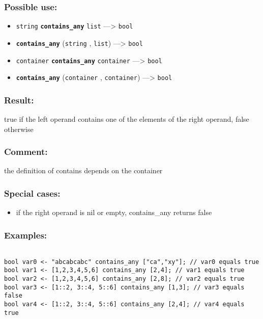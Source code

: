 \documentclass[]{book}
\providecommand{\tightlist}{%
  \setlength{\itemsep}{0pt}\setlength{\parskip}{0pt}}
\theoremstyle{definition}
\theoremstyle{definition}
\theoremstyle{definition}
\theoremstyle{remark}
\begin{document}
\subsubsection{Possible use:}\label{possible-use-101}

\begin{itemize}
\tightlist
\item
  \texttt{string} \textbf{\texttt{contains\_any}} \texttt{list}
  ---\textgreater{} \texttt{bool}
\item
  \textbf{\texttt{contains\_any}} (\texttt{string} , \texttt{list})
  ---\textgreater{} \texttt{bool}
\item
  \texttt{container} \textbf{\texttt{contains\_any}} \texttt{container}
  ---\textgreater{} \texttt{bool}
\item
  \textbf{\texttt{contains\_any}} (\texttt{container} ,
  \texttt{container}) ---\textgreater{} \texttt{bool}
\end{itemize}

\subsubsection{Result:}\label{result-99}

true if the left operand contains one of the elements of the right
operand, false otherwise

\subsubsection{Comment:}\label{comment-26}

the definition of contains depends on the container

\subsubsection{Special cases:}\label{special-cases-34}

\begin{itemize}
\tightlist
\item
  if the right operand is nil or empty, contains\_any returns false
\end{itemize}

\subsubsection{Examples:}\label{examples-78}

\begin{verbatim}
 
bool var0 <- "abcabcabc" contains_any ["ca","xy"]; // var0 equals true 
bool var1 <- [1,2,3,4,5,6] contains_any [2,4]; // var1 equals true  
bool var2 <- [1,2,3,4,5,6] contains_any [2,8]; // var2 equals true 
bool var3 <- [1::2, 3::4, 5::6] contains_any [1,3]; // var3 equals false 
bool var4 <- [1::2, 3::4, 5::6] contains_any [2,4]; // var4 equals true
\end{verbatim}
\end{document}
